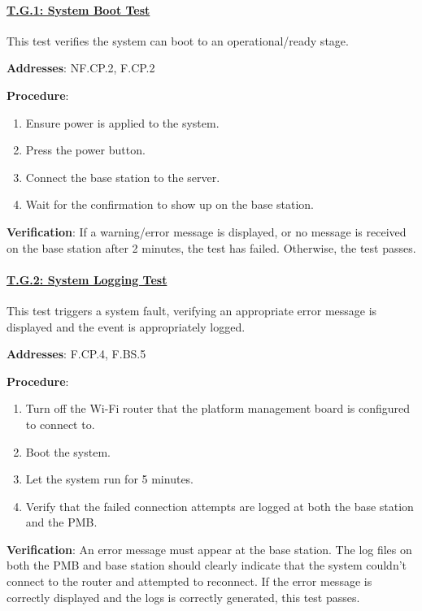 \paragraph{\underline{T.G.1: System Boot Test}}

This test verifies the system can boot to an operational/ready stage.

\textbf{Addresses}: NF.CP.2, F.CP.2

\textbf{Procedure}:
\begin{enumerate}[noitemsep]
    \item Ensure power is applied to the system.
    \item Press the power button.
    \item Connect the base station to the server.
    \item Wait for the confirmation to show up on the base station.
\end{enumerate}

\textbf{Verification}: 
If a warning/error message is displayed, or no message is received on the base station after 2 minutes, the test has failed. Otherwise, the test passes.

%

\paragraph{\underline{T.G.2: System Logging Test}}

This test triggers a system fault, verifying an appropriate error message is displayed and the event is appropriately logged.

\textbf{Addresses}: F.CP.4, F.BS.5

\textbf{Procedure}:
\begin{enumerate}[noitemsep]
    \item Turn off the Wi-Fi router that the platform management board is configured to connect to.
    \item Boot the system.
    \item Let the system run for 5 minutes.
    \item Verify that the failed connection attempts are logged at both the base station and the PMB.
\end{enumerate}

\textbf{Verification}: 
An error message must appear at the base station. The log files on both the PMB and base station should clearly indicate that the system couldn't connect to the router and attempted to reconnect. If the error message is correctly displayed and the logs is correctly generated, this test passes.

